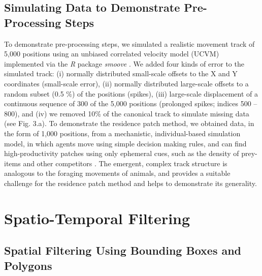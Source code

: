 \begin{refsection}[sorting=nyt]
    \subsection*{Simulating Data to Demonstrate Pre-Processing Steps}

    To demonstrate pre-processing steps, we simulated a realistic movement track of 5,000 positions using an unbiased correlated velocity model (UCVM) implemented via the \textit{R} package \textit{smoove} \citep[][see Fig. 3.a]{gurarie2017}.
    We added four kinds of error to the simulated track: (i) normally distributed small-scale offsets to the X and Y coordinates (small-scale error), (ii) normally distributed large-scale offsets to a random subset (0.5 \%) of the positions (spikes), (iii) large-scale displacement of a continuous sequence of 300 of the 5,000 positions (prolonged spikes; indices 500 -- 800), and (iv) we removed 10\% of the canonical track to simulate missing data (see Fig. 3.a).
    To demonstrate the residence patch method, we obtained data, in the form of 1,000 positions, from a mechanistic, individual-based simulation model, in which agents move using simple decision making rules, and can find high-productivity patches using only ephemeral cues, such as the density of prey-items and other competitors \citep{gupte2021a, netz2021}.
    The emergent, complex track structure is analogous to the foraging movements of animals, and provides a suitable challenge for the residence patch method and helps to demonstrate its generality.

    \section*{Spatio-Temporal Filtering}

    \subsection*{Spatial Filtering Using Bounding Boxes and Polygons}


\end{refsection}
